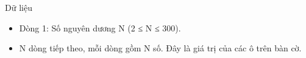 Dữ liệu
\begin{itemize}
	\item Dòng 1: Số nguyên dương N (2 ≤ N ≤ 300).
	\item N dòng tiếp theo, mỗi dòng gồm N số. Đây là giá trị của các ô trên bàn cờ.
\end{itemize}